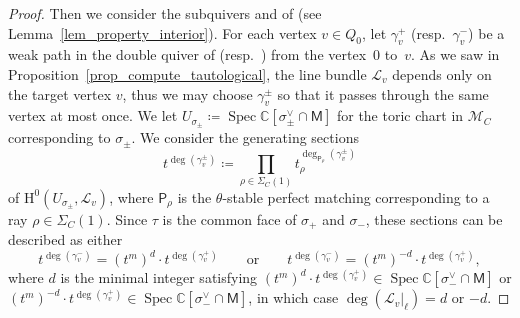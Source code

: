 \documentclass[10pt,a4paper]{amsart}
\numberwithin{equation}{section}
\theoremstyle{definition}
\newcommand{\CC}{\mathbb{C}}
\newcommand{\calL}{\mathcal{L}}
\newcommand{\calM}{\mathcal{M}}
\newcommand{\rmH}{\mathrm{H}}
\newcommand{\sfM}{\mathsf{M}}
\newcommand{\sfP}{\mathsf{P}}
\newcommand{\Spec}{\operatorname{Spec}}
\begin{document}
\begin{proof}
Then we consider the subquivers  and  of  (see Lemma~\ref{lem_property_interior}).
For each vertex $v\in Q_0$, let $\gamma_v^+$ (resp.\ $\gamma_v^-$) be a weak path in the double quiver of  (resp.\ )
from the vertex~$0$ to~$v$.
As we saw in Proposition~\ref{prop_compute_tautological}, the line bundle $\calL_v$ depends only on the target vertex $v$,
thus we may choose $\gamma_v^\pm$ so that it passes through the same vertex at most once.
We let $U_{\sigma_{\pm}}\coloneqq \Spec\CC[\sigma_{\pm}^\vee\cap \sfM]$ for the toric chart in $\calM_C$ corresponding to $\sigma_{\pm}$.
We consider the generating sections
\[
t^{\deg(\gamma^\pm_v)}\coloneqq\prod_{\rho\in\Sigma_C(1)}t_\rho^{\deg_{\sfP_\rho}(\gamma^\pm_v)}
\]
of $\rmH^0(U_{\sigma_\pm}, \calL_v)$, where $\sfP_\rho$ is the $\theta$-stable perfect matching corresponding to a ray $\rho\in\Sigma_C(1)$.
Since $\tau$ is the common face of $\sigma_+$ and $\sigma_-$, these sections can be described as either
\begin{equation}
\label{eq_degree_linebdl}
t^{\deg(\gamma^-_v)}=(t^m)^d\cdot t^{\deg(\gamma^+_v)}\qquad \text{or} \qquad t^{\deg(\gamma^-_v)}=(t^m)^{-d}\cdot t^{\deg(\gamma^+_v)},
\end{equation}
where $d$ is the minimal integer satisfying $(t^m)^{d}\cdot t^{\deg(\gamma^+_v)}\in \Spec\CC[\sigma_{-}^\vee\cap \sfM]$ or
$(t^m)^{-d}\cdot t^{\deg(\gamma^+_v)}\in \Spec\CC[\sigma_{-}^\vee\cap \sfM]$,
in which case $\deg(\calL_v |_\ell)=d$ or $-d$.


\end{proof}
\end{document}
